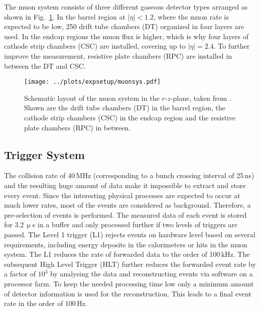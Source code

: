 \noindent The muon system consists of three different gaseous detector types arranged as shown in Fig.~\ref{fig:expsetup:muonsys}. In the barrel region at $|\eta|<1.2$, where the muon rate is expected to be low, 250 drift tube chambers (DT) organized in four layers are used. In the endcap regions the muon flux is higher, which is why four layers of  cathode strip chambers (CSC) are installed, covering up to $|\eta|=2.4$. To further improve the measurement, resistive plate chambers (RPC) are installed in between the DT and CSC.
\begin{figure}
    \centering
    \texttt{[image: ../plots/expsetup/muonsys.pdf]}
    \caption[Schematic layout of the muon system in the $r$-$z$-plane]{Schematic layout of the muon system in the $r$-$z$-plane, taken from \cite{CMS_design}. Shown are the drift tube chambers (DT) in the barrel region, the cathode strip chambers (CSC) in the endcap region and the resistive plate chambers (RPC) in between.}
    \label{fig:expsetup:muonsys}
\end{figure}
\subsection*{Trigger System}
The collision rate of 40\,MHz (corresponding to a bunch crossing interval of 25\,ns) and the resulting huge amount of data make it impossible to extract and store every event. Since the interesting physical processes are expected to occur at much lower rates, most of the events are considered as background. Therefore, a pre-selection of events is performed. The measured data of each event is stored for 3.2\,$\upmu$s in a buffer and only processed further if two levels of triggers are passed. The Level 1 trigger (L1) \cite{triggerL1} rejects events on hardware level based on several requirements, including energy deposits in the calorimeters or hits in the muon system. The L1 reduces the rate of forwarded data to the order of 100\,kHz. The subsequent High Level Trigger (HLT) \cite{HLT} further reduces the forwarded event rate by a factor of $10^3$ by analysing the data and reconstructing events via software on a processor farm. To keep the needed processing time low only a minimum amount of detector information is used for the reconstruction. This leads to a final event rate in the order of 100\,Hz.
